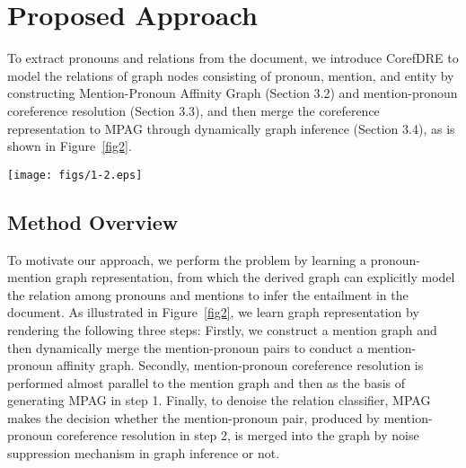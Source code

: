 \documentclass{article}
\begin{document}
\section{Proposed Approach}

To extract pronouns and relations from the document, we introduce CorefDRE to model the relations of graph nodes consisting  of pronoun, mention, and entity by constructing Mention-Pronoun Affinity Graph (Section 3.2) and mention-pronoun coreference resolution (Section 3.3), and then merge the coreference representation to MPAG through dynamically graph inference (Section 3.4), as is shown in  Figure~\ref{fig2}.

\begin{figure*}[ht]
    \centering
    \setlength{\abovecaptionskip}{0cm}
    \setlength{\belowcaptionskip}{-0.4cm}
    \vspace{-0.8cm}
    \texttt{[image: figs/1-2.eps]}
    \caption{Architecture of our CorefDRE. First, the document is fed into encoder respectively, and then MPAG is constructed with pronoun nodes and mention nodes. Second, mention-pronoun coreference resolution takes use of contextualized representation and mention-pronoun pairs to calculate affinity. Third, merge the output of mention-pronoun coreference resolution to MPAG with noise suppression mechanism by applying GCN. Finally, the graph is transformed into EG, where the paths between entities are identified for reasoning. Different entities are drawn with colors, the squares represent the relationship between entity pairs, and the number in each circle is the sentence number.}
    \label{fig2}
\end{figure*}

\subsection{Method Overview}

To motivate our approach, we perform the problem by learning a pronoun-mention graph representation, from which the derived graph can explicitly model the relation among pronouns and mentions to infer the entailment in the document. As illustrated in Figure~\ref{fig2}, we learn graph representation by rendering the following three steps: Firstly, we construct a mention graph and then dynamically merge the mention-pronoun pairs to conduct a mention-pronoun affinity graph.
Secondly, mention-pronoun coreference resolution is performed almost parallel to the mention graph and then as the basis of generating MPAG in step 1.
Finally, to denoise the relation classifier, MPAG makes the decision whether the mention-pronoun pair, produced by mention-pronoun coreference resolution in step 2, is merged into the graph by noise suppression mechanism in graph inference or not.
\end{document}

